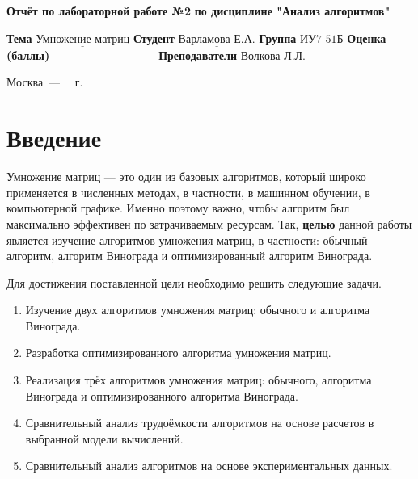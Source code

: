 \documentclass[12pt]{report}
\begin{document}
\begin{titlepage}
	
	\begin{center}
		\noindent\begin{minipage}{1.3\textwidth}\centering
			\Large\textbf{  Отчёт по лабораторной работе №2}\newline
			\textbf{по дисциплине "Анализ алгоритмов"}\newline\newline
		\end{minipage}
	\end{center}
	
	\noindent\textbf{Тема} $\underline{\text{Умножение матриц}}$\newline\newline
	\noindent\textbf{Студент} $\underline{\text{Варламова Е.А.}}$\newline\newline
	\noindent\textbf{Группа} $\underline{\text{ИУ7-51Б}}$\newline\newline
	\noindent\textbf{Оценка (баллы)} $\underline{\text{~~~~~~~~~~~~~~~~~~~~~~~~~~~}}$\newline\newline
	\noindent\textbf{Преподаватели} $\underline{\text{Волкова Л.Л.}}$\newline\newline\newline
	
	\begin{center}
		\vfill
		Москва~---~\the\year
		~г.
	\end{center}
\end{titlepage}
\newpage
\setcounter{page}{2}
\tableofcontents

\chapter*{Введение}
Умножение матриц — это один из базовых алгоритмов, который широко применяется в численных методах, в частности, в машинном обучении, в компьютерной графике. Именно поэтому важно, чтобы алгоритм был максимально эффективен по затрачиваемым ресурсам. Так, \textbf{целью} данной работы является изучение алгоритмов умножения матриц, в частности: обычный алгоритм, алгоритм Винограда и оптимизированный алгоритм Винограда. 

Для достижения поставленной цели необходимо решить следующие задачи.
\begin{enumerate}
	\item Изучение двух алгоритмов умножения матриц: обычного и алгоритма Винограда.
	\item Разработка оптимизированного алгоритма умножения матриц.
	\item Реализация трёх алгоритмов умножения матриц: обычного, алгоритма Винограда и оптимизированного алгоритма Винограда.
	\item Сравнительный анализ трудоёмкости алгоритмов на основе расчетов в выбранной модели вычислений.
	\item Сравнительный анализ алгоритмов на основе экспериментальных данных.
\end{enumerate}
\end{document}

